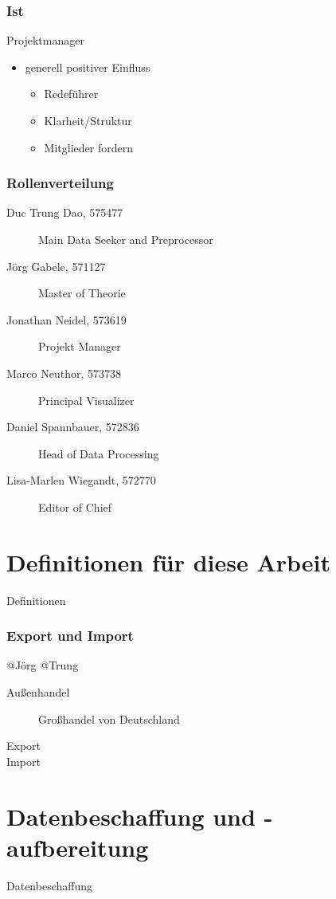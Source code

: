 \documentclass{beamer}
\begin{document}
\begin{frame}
\frametitle{Ist}
Projektmanager
  \begin{itemize}
    \item generell positiver Einfluss
      \begin{itemize}
        \item  Redeführer
        \item  Klarheit/Struktur
        \item  Mitglieder fordern
      \end{itemize}
  \end{itemize}
\end{frame}

\begin{frame}
	\frametitle{Rollenverteilung}
	\begin{description}
		\item[Duc Trung Dao, 575477]Main Data Seeker and Preprocessor
		\item[Jörg Gabele, 571127]Master of Theorie
		\item[Jonathan Neidel, 573619]Projekt Manager
		\item[Marco Neuthor, 573738]Principal Visualizer
		\item[Daniel Spannbauer, 572836]Head of Data Processing
		\item[Lisa-Marlen Wiegandt, 572770]Editor of Chief
	\end{description}
    \end{frame}

\section{Definitionen für diese Arbeit}
\begin{frame}
	\begin{center}
		{\Huge Definitionen}
	\end{center}
\end{frame}

\begin{frame}
\frametitle{Export und Import}
	@Jörg @Trung
	\begin{description}
		\item[Außenhandel] Großhandel von Deutschland
		\item[Export]
		\item[Import]
	\end{description}
\end{frame}

\section{Datenbeschaffung und -aufbereitung}
\begin{frame}
	\begin{center}
		{\Huge Datenbeschaffung}
	\end{center}
\end{frame}
\end{document}
